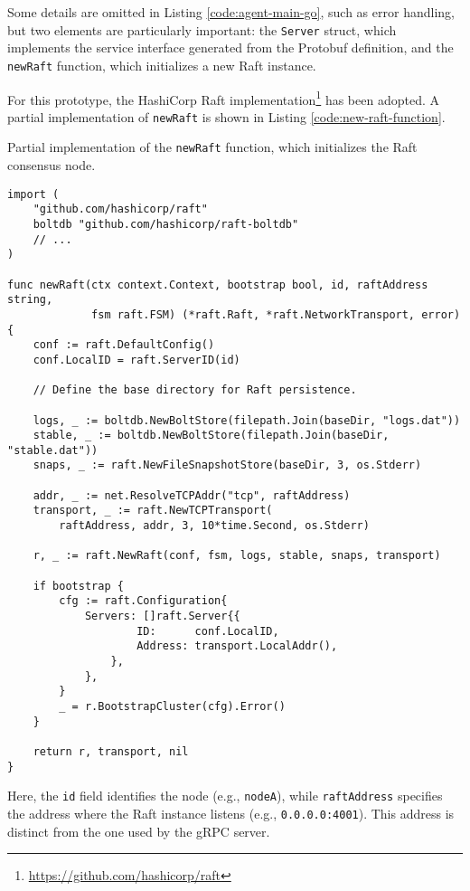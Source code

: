 Some details are omitted in Listing \ref{code:agent-main-go}, such as error handling, but two elements are particularly important:
the \texttt{Server} struct, which implements the service interface generated from the Protobuf definition, and the \texttt{newRaft} function, which initializes a new Raft instance.  

For this prototype, the HashiCorp Raft implementation\footnote{\url{https://github.com/hashicorp/raft}} has been adopted. A partial implementation of \texttt{newRaft} is shown in Listing \ref{code:new-raft-function}.

\begin{listing}[H]
\caption{Partial implementation of the \texttt{newRaft} function, which initializes the Raft consensus node.}
\label{code:new-raft-function}
\begin{verbatim}
import (
    "github.com/hashicorp/raft"
    boltdb "github.com/hashicorp/raft-boltdb"
    // ...
)

func newRaft(ctx context.Context, bootstrap bool, id, raftAddress string,
             fsm raft.FSM) (*raft.Raft, *raft.NetworkTransport, error) {
    conf := raft.DefaultConfig()
    conf.LocalID = raft.ServerID(id)

    // Define the base directory for Raft persistence.

    logs, _ := boltdb.NewBoltStore(filepath.Join(baseDir, "logs.dat"))
    stable, _ := boltdb.NewBoltStore(filepath.Join(baseDir, "stable.dat"))
    snaps, _ := raft.NewFileSnapshotStore(baseDir, 3, os.Stderr)

    addr, _ := net.ResolveTCPAddr("tcp", raftAddress)
    transport, _ := raft.NewTCPTransport(
        raftAddress, addr, 3, 10*time.Second, os.Stderr)

    r, _ := raft.NewRaft(conf, fsm, logs, stable, snaps, transport)

    if bootstrap {
        cfg := raft.Configuration{
            Servers: []raft.Server{{
                    ID:      conf.LocalID,
                    Address: transport.LocalAddr(),
                },
            },
        }
        _ = r.BootstrapCluster(cfg).Error()
    }

    return r, transport, nil
}
\end{verbatim}
\end{listing}

Here, the \texttt{id} field identifies the node (e.g., \texttt{nodeA}), while \texttt{raftAddress} specifies the address where the Raft instance listens (e.g., \texttt{0.0.0.0:4001}). This address is distinct from the one used by the gRPC server.

